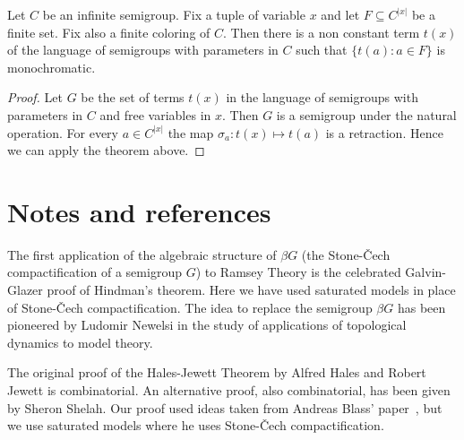 \documentclass[creche.tex]{subfiles}
\begin{document}
\begin{HalesJewett}\label{thm_HalesJewett}
Let $C$ be an infinite semigroup.
Fix a tuple of variable $x$ and let $F\subseteq C^{|x|}$ be a finite set.
Fix also a finite coloring of $C$.
Then there is a non constant term $t(x)$ 
of the language of semigroups with parameters in $C$
such that $\{ t(a): a\in F\}$ is monochromatic.
\end{HalesJewett}

\begin{proof}
Let $G$ be the set of terms $t(x)$ in the language of semigroups 
with parameters in $C$ and free variables in $x$.
Then $G$ is a semigroup under the natural operation.
For every $a\in C^{|x|}$ the map $\sigma_a:t(x)\mapsto t(a)$ is a retraction.
Hence we can apply the theorem above.
\end{proof}

\section{Notes and references}

The first application of the algebraic structure of $\beta G$ 
(the Stone-\v{C}ech compactification of a semigroup $G$) 
to Ramsey Theory is the celebrated Galvin-Glazer proof of Hindman's theorem. 
Here we have used saturated models in place of Stone-\v{C}ech compactification.
The idea to replace the semigroup $\beta G$  has been pioneered by Ludomir Newelsi
in the study of applications of topological dynamics to model theory. 

The original proof of the Hales-Jewett Theorem by Alfred Hales and Robert Jewett is combinatorial.
An alternative proof, also combinatorial, has been given by Sheron Shelah.
Our proof used ideas taken from Andreas Blass' paper~\cite{Blass}, but we use saturated models where he uses Stone-\v{C}ech compactification.


\begin{biblist}[]\normalsize


\end{biblist}
\end{document}
